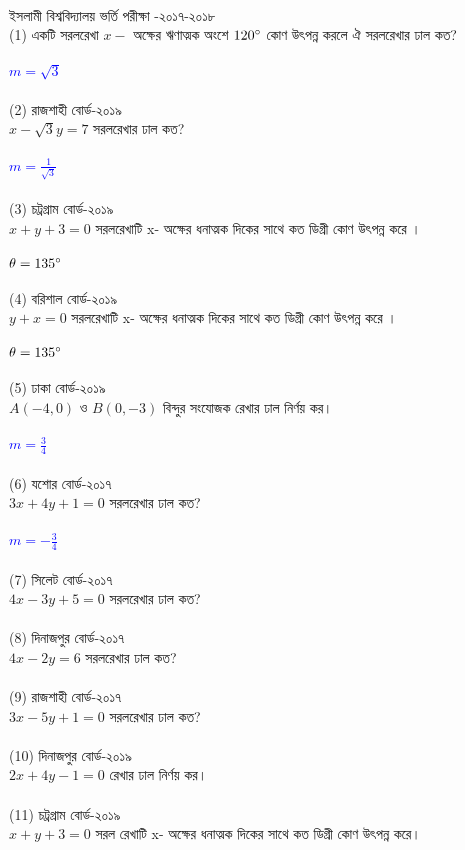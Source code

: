 \documentclass{article}
\begin{document}
\\
ইসলামী  বিশ্ববিদ্যালয় ভর্তি পরীক্ষা -২০১৭-২০১৮\\ 
(1) একটি সরলরেখা $x-$ অক্ষের ঋণাত্মক অংশে $120\degree $ কোণ উৎপন্ন করলে ঐ সরলরেখার ঢাল কত? \\
\\ 
\textcolor{blue}{$m=\sqrt{3}$}\\
\\ 
(2) রাজশাহী বোর্ড-২০১৯\\
$x-\sqrt{3}y=7$ সরলরেখার ঢাল কত?\\
\\ 
\textcolor{blue}{$m=\frac{1}{\sqrt{3}}$}\\
\\ 
(3) চট্রগ্রাম বোর্ড-২০১৯\\
$x+y+3=0$ সরলরেখাটি x-  অক্ষের ধনাত্মক দিকের সাথে কত ডিগ্রী কোণ উৎপন্ন করে । \\
\\
\textcolor{blue}{$\theta=135\degree$}\\
\\
(4) বরিশাল বোর্ড-২০১৯\\
$y+x=0$ সরলরেখাটি x-  অক্ষের ধনাত্মক দিকের সাথে কত ডিগ্রী কোণ উৎপন্ন করে । \\
\\
\textcolor{blue}{$\theta=135\degree$}\\
\\
(5) ঢাকা বোর্ড-২০১৯\\
$A(-4,0)$ ও $B(0,-3)$ বিন্দুর সংযোজক রেখার ঢাল নির্ণয় কর।\\
\\ 
\textcolor{blue}{$m=\frac{3}{4}$}\\
\\ 
(6) যশোর বোর্ড-২০১৭\\
$3x+4y+1=0$ সরলরেখার ঢাল কত?\\  
\\ 
\textcolor{blue}{$m=-\frac{3}{4}$}\\
\\ 
(7) সিলেট বোর্ড-২০১৭\\
$4x-3y+5=0$ সরলরেখার ঢাল কত?\\
\\
(8) দিনাজপুর  বোর্ড-২০১৭\\
$4x-2y=6$ সরলরেখার ঢাল কত?\\
\\
(9) রাজশাহী  বোর্ড-২০১৭\\
$3x-5y+1=0$ সরলরেখার ঢাল কত?\\
\\
(10)  দিনাজপুর বোর্ড-২০১৯\\
$2x+4y-1=0$ রেখার ঢাল নির্ণয় কর।\\
\\
(11)  চট্রগ্রাম বোর্ড-২০১৯\\ 
$x+y+3=0$ সরল রেখাটি x- অক্ষের ধনাত্মক দিকের সাথে কত ডিগ্রী কোণ উৎপন্ন করে।  \\
\end{document}
